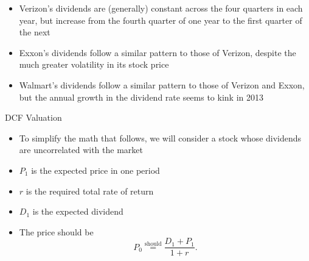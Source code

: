 \documentclass{beamer}
\newcommand{\should}{\overset{\text{should}}{=}}
\begin{document}
\begin{frame}{}
	\begin{itemize}
		\item Verizon's dividends are (generally) constant across the four quarters in each year, but increase from the fourth quarter of one year to the first quarter of the next
		\item Exxon's dividends follow a similar pattern to those of Verizon, despite the much greater volatility in its stock price
		\item Walmart's dividends follow a similar pattern to those of Verizon and Exxon, but the annual growth in the dividend rate seems to kink in 2013
	\end{itemize}
\end{frame}

\begin{frame}
	\begin{center}
		\Huge DCF Valuation
	\end{center}
\end{frame}

\begin{frame}{}
	\begin{itemize}
	\item To simplify the math that follows, we will consider a stock whose dividends are uncorrelated with the market
	\end{itemize}
	\begin{figure}[H]
		\begin{center}
		\end{center}
	\end{figure}
	\begin{itemize}
		\item $P_{1}$ is the expected price in one period 
		\item $r$ is the required total rate of return 
		\item $D_{1}$ is the expected dividend 
		\item The price should be
		\begin{equation*}
			P_{0}\should\frac{D_{1}+P_{1}}{1+r}.
		\end{equation*}
	\end{itemize}
\end{frame}
\end{document}
